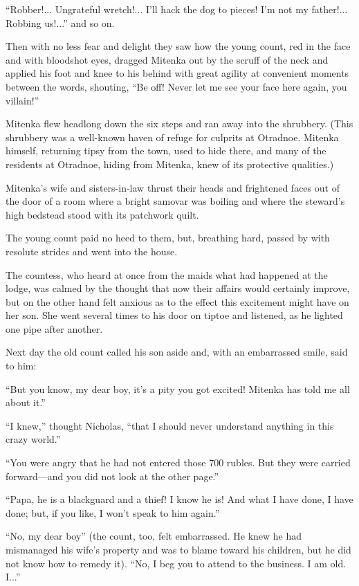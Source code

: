 ``Robber!... Ungrateful wretch!... I'll hack the dog to pieces!
I'm not my father!... Robbing us!...'' and so on.

Then with no less fear and delight they saw how the young count,
red in the face and with bloodshot eyes, dragged Mitenka out by
the scruff of the neck and applied his foot and knee to his
behind with great agility at convenient moments between the
words, shouting, ``Be off! Never let me see your face here again,
you villain!''

Mitenka flew headlong down the six steps and ran away into the
shrubbery. (This shrubbery was a well-known haven of refuge for
culprits at Otradnoe. Mitenka himself, returning tipsy from the
town, used to hide there, and many of the residents at Otradnoe,
hiding from Mitenka, knew of its protective qualities.)

Mitenka's wife and sisters-in-law thrust their heads and
frightened faces out of the door of a room where a bright samovar
was boiling and where the steward's high bedstead stood with its
patchwork quilt.

The young count paid no heed to them, but, breathing hard, passed
by with resolute strides and went into the house.

The countess, who heard at once from the maids what had happened
at the lodge, was calmed by the thought that now their affairs
would certainly improve, but on the other hand felt anxious as to
the effect this excitement might have on her son. She went
several times to his door on tiptoe and listened, as he lighted
one pipe after another.

Next day the old count called his son aside and, with an
embarrassed smile, said to him:

``But you know, my dear boy, it's a pity you got excited! Mitenka
has told me all about it.''

``I knew,'' thought Nicholas, ``that I should never understand
anything in this crazy world.''

``You were angry that he had not entered those 700 rubles. But
they were carried forward---and you did not look at the other
page.''

``Papa, he is a blackguard and a thief! I know he is! And what I
have done, I have done; but, if you like, I won't speak to him
again.''

``No, my dear boy'' (the count, too, felt embarrassed. He knew he
had mismanaged his wife's property and was to blame toward his
children, but he did not know how to remedy it). ``No, I beg you
to attend to the business. I am old. I...''

